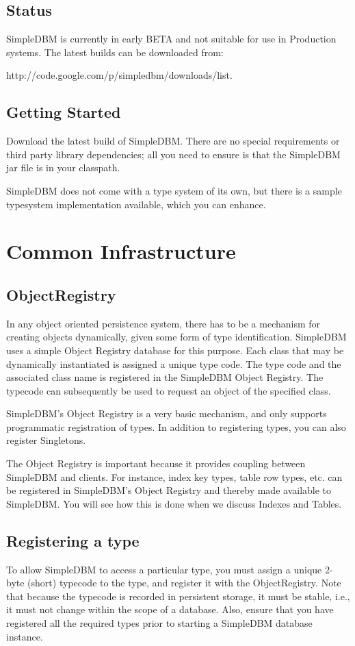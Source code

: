 \documentclass[a4paper,draft,oneside]{book}
\begin{document}
\section{Status}
SimpleDBM is currently in early BETA and not suitable for use in Production systems. The latest builds can be downloaded from:

http://code.google.com/p/simpledbm/downloads/list.

\section{Getting Started}
Download the latest build of SimpleDBM.
There are no special requirements or third party library dependencies; all you
need to ensure is that the SimpleDBM jar file is in your classpath.

SimpleDBM does not come with a type system of its own, but there is a sample
typesystem implementation available, which you can enhance. 

\chapter{Common Infrastructure}

\section{ObjectRegistry}
In any object oriented persistence system, there has to be a mechanism
for creating objects dynamically, given some form of type
identification. SimpleDBM uses a simple Object Registry database for
this purpose. Each class that may be dynamically instantiated is
assigned a unique type code. The type code and the associated class
name is registered in the SimpleDBM Object Registry. The typecode can
subsequently be used to request an object of the specified class.

SimpleDBM's Object Registry is a very basic mechanism, and only
supports programmatic registration of types. In addition to
registering types, you can also register Singletons.

The Object Registry is important because it provides
coupling between SimpleDBM and clients. For instance, index key
types, table row types, etc. can be registered in SimpleDBM's
Object Registry and thereby made available to SimpleDBM. You will
see how this is done when we discuss Indexes and Tables.

\section{Registering a type}
To allow SimpleDBM to access a particular type, you must assign a
unique 2-byte (short) typecode to the type, and register it with the
ObjectRegistry. Note that because the typecode is recorded in
persistent storage, it must be stable, i.e., it must not change within
the scope of a database. Also, ensure that you have registered all the
required types prior to starting a SimpleDBM database instance.
\end{document}
